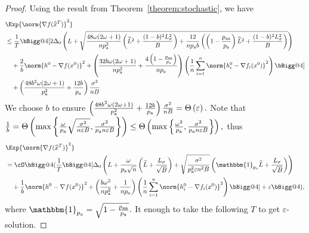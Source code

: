 \documentclass{article}
\makeatletter
\newcommand*{\probavailable}{\ensuremath{p_{\textnormal{a}}}}
\newcommand*{\probpairaa}{\ensuremath{p_{\textnormal{aa}}}}
\newcommand{\vast}{\bBigg@{4}}
\makeatother
\begin{document}
  \begin{proof}
    Using the result from Theorem~\ref{theorem:stochastic}, we have
    \begin{align*}
        &\Exp{\norm{\nabla f(\widehat{x}^T)}^2} \\
        &\leq \frac{1}{T}\vast[2 \Delta_0\left(L + \sqrt{\frac{48 \omega (2 \omega + 1)}{n \probavailable^2} \left(\widehat{L}^2 + \frac{(1 - b)^2 L_{\sigma}^2}{B}\right) + \frac{12}{n \probavailable b}\left(\left(1 - \frac{\probpairaa}{\probavailable}\right) \widehat{L}^2 + \frac{(1 - b)^2 L_{\sigma}^2}{B}\right)}\right) \\
        &\quad + \frac{2}{b} \norm{h^{0} - \nabla f(x^{0})}^2 + \left(\frac{32 b \omega (2 \omega + 1)}{n \probavailable^2} + \frac{4 \left(1 - \frac{\probpairaa}{\probavailable}\right)}{n \probavailable}\right)\left(\frac{1}{n}\sum_{i=1}^n\norm{h^{0}_i - \nabla f_i(x^{0})}^2\right)\vast] \\
        &\quad+ \left(\frac{48 b^2 \omega (2 \omega + 1)}{\probavailable^2} + \frac{12 b}{\probavailable}\right) \frac{\sigma^2}{n B}
    \end{align*}
    We choose $b$ to ensure $\left(\frac{48 b^2 \omega (2 \omega + 1)}{\probavailable^2} + \frac{12 b}{\probavailable}\right) \frac{\sigma^2}{n B} = \Theta\left(\varepsilon\right).$ Note that $\frac{1}{b} = \Theta\left(\max\left\{\frac{\omega}{\probavailable} \sqrt{\frac{\sigma^2}{n \varepsilon B}}, \frac{\sigma^2}{\probavailable n \varepsilon B}\right\}\right) \leq \Theta\left(\max\left\{\frac{\omega^2}{\probavailable}, \frac{\sigma^2}{\probavailable n \varepsilon B}\right\}\right),$ thus
    \begin{align*}
        &\Exp{\norm{\nabla f(\widehat{x}^T)}^2} \\
        &= \cO\vast(\frac{1}{T}\vast[\Delta_0\left(L + \frac{\omega}{\probavailable \sqrt{n}} \left(\widehat{L} + \frac{L_{\sigma}}{\sqrt{B}}\right) + \sqrt{\frac{\sigma^2}{\probavailable^2 \varepsilon n^2 B}}\left(\mathbbm{1}_{\probavailable}\widehat{L} + \frac{L_{\sigma}}{\sqrt{B}}\right)\right)\\
        &\quad + \frac{1}{b} \norm{h^{0} - \nabla f(x^{0})}^2 + \left(\frac{b \omega^2}{n \probavailable^2} + \frac{1}{n \probavailable}\right)\left(\frac{1}{n}\sum_{i=1}^n\norm{h^{0}_i - \nabla f_i(x^{0})}^2\right)\vast] + \varepsilon\vast),
    \end{align*}
    where $\mathbbm{1}_{\probavailable} = \sqrt{1 - \frac{\probpairaa}{\probavailable}}.$
    It enough to take the following $T$ to get $\varepsilon$-solution.

\end{proof}
\end{document}
